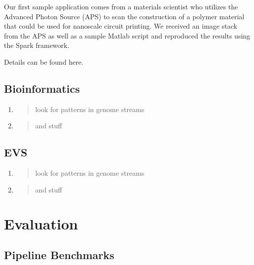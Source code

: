 \documentclass{sig-alternate}
\begin{document}
Our first sample application comes from a materials scientist who
utilizes the Advanced Photon Source (APS) to scan the construction of a
polymer material that could be used for nanoscale circuit printing. We
received an image stack from the APS as well as a sample Matlab script
and reproduced the results using the Spark framework.

Details can be found here.

\subsection{Bioinformatics}\label{bioinformatics}

\begin{enumerate}
\def\labelenumi{\arabic{enumi}.}
\item
  \begin{quote}
  look for patterns in genome streams
  \end{quote}
\item
  \begin{quote}
  and stuff
  \end{quote}
\end{enumerate}

\subsection{EVS}\label{evs}

\begin{enumerate}
\def\labelenumi{\arabic{enumi}.}
\item
  \begin{quote}
  look for patterns in genome streams
  \end{quote}
\item
  \begin{quote}
  and stuff
  \end{quote}
\end{enumerate}

\section{Evaluation}\label{evaluation}

\subsection{Pipeline Benchmarks}\label{pipeline-benchmarks}
\end{document}
